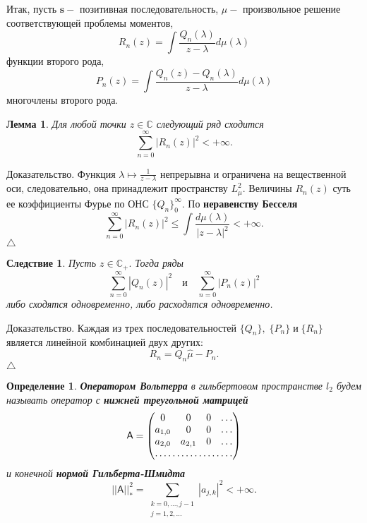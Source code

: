 \documentclass[12pt,a4paper]{article}
\theoremstyle{plain}   \newtheorem{Pro}{Задача}
\newtheorem{Def}{Определение}
\newtheorem{Cor}{Следствие}
\newtheorem{Lem}{Лемма}
\begin{document}
Итак, пусть
$ \mathbf{s} - $
позитивная последовательность,
$ \mu - $
произвольное решение соответствующей проблемы моментов,
$$
  R_n (z)=\int \frac{Q_n (\lambda )}{z-\lambda}
  d\mu (\lambda )
$$
функции второго рода,
$$
  P_n (z)=\int \frac{Q_n (z)-Q_n (\lambda)}
  {z-\lambda}d\mu (\lambda )
$$
многочлены второго рода.
\begin{Lem}
Для любой точки
$ z \in \mathbb{C} $
следующий ряд сходится
$$
  \sum _{n=0}^{\infty}|R_n (z)|^2 < + \infty .
$$
\end{Lem}
{\Large Доказательство.}
Функция
$ \lambda \mapsto \frac{1}{z-\lambda} $
непрерывна и ограничена на вещественной оси, следовательно,
она принадлежит пространству
$ L_{\mu}^2 . $
Величины
$ R_n (z) $
суть ее коэффициенты Фурье по ОНС
$ \{ Q_n \} _0 ^{\infty} . $
По
{\bfseries неравенству Бесселя}
$$
  \sum _{n=0}^{\infty} |R_n (z)|^2 \leq
  \int \frac{d\mu (\lambda )}{|z-\lambda |^2}
  < + \infty .
$$
$ \triangle $
\begin{Cor}
Пусть
$ z \in \mathbb{C}_+ . $
Тогда ряды
$$
  \sum _{n=0}^{\infty} |Q_n (z)|^2 \quad и \quad
  \sum _{n=0}^{\infty} |P_n (z)|^2
$$
либо сходятся одновременно, либо расходятся одновременно.
\end{Cor}
{\Large Доказательство.}
Каждая из трех последовательностей
$ \{ Q_n \} , \; \{ P_n \} \; и \; \{ R_n \} $
является линейной комбинацией двух других:
$$
  R_n = Q_n \hat \mu - P_n .
$$
$ \triangle $
\begin{Def}
{\bfseries Оператором Вольтерра}
в гильбертовом пространстве
$ l_2 $
будем называть оператор с
{\bfseries нижней треугольной матрицей}
\begin{equation*}
  \mathsf{A}=
    \begin{pmatrix}
	  0 & 0 & 0 & \dots \\
	  a_{1,0} & 0 & 0 & \dots \\
	  a_{2,0} & a_{2,1} & 0 & \dots \\
	  \hdotsfor{4}
	\end{pmatrix}
\end{equation*}
и конечной
{\bfseries нормой Гильберта-Шмидта}
$$
  ||\mathsf{A}||_{\ast}^2 =
  \sum _{\substack{k=0,...,j-1 \\ j=1,2,... }}
  |a_{j,k}|^2 < + \infty .
$$
\end{Def}
\end{document}

